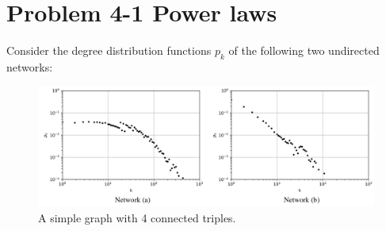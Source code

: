 \section{Problem 4-1 Power laws}

Consider the degree distribution functions $p_k$ of the following two undirected networks:

\begin{figure}[h]
	\centering
	\includegraphics[width=0.9\linewidth]{images/problem41_degree_distribution_networks.png}
	\caption{A simple graph with 4 connected triples.}
	\label{distribution}
\end{figure}

